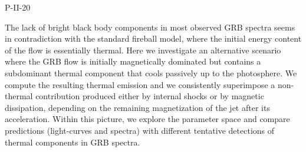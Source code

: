 P-II-20


\bigskip



\bigskip

\noindent The lack of bright black body components in most observed GRB spectra seems in contradiction with the standard fireball model, where the initial energy content of the flow is essentially thermal. Here we investigate an alternative scenario where the GRB flow is initially magnetically dominated but contains a subdominant thermal component that cools passively up to the photosphere. We compute the resulting thermal emission and we consistently superimpose a non-thermal contribution produced either by internal shocks or by magnetic dissipation, depending on the remaining magnetization of the jet after its acceleration. Within this picture, we explore the parameter space and compare predictions (light-curves and spectra) with different tentative detections of thermal components in GRB spectra.
